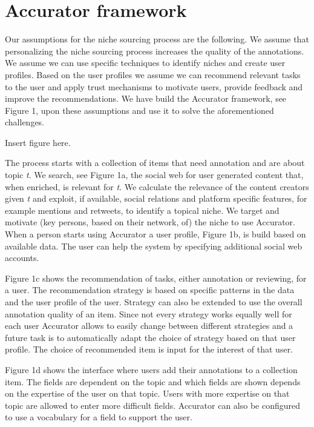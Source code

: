 \section{Accurator framework}
\label{architecture}
Our assumptions for the niche sourcing process are the following. We assume that personalizing the niche sourcing process increases the quality of the annotations. We assume we can use specific techniques to identify niches and create user profiles. Based on the user profiles we assume we can recommend relevant tasks to the user and apply trust mechanisms to motivate users, provide feedback and improve the recommendations.  We have build the Accurator framework, see Figure 1, upon these assumptions and use it to solve the aforementioned challenges. 

Insert figure here.

The process starts with a collection of items that need annotation and are about topic \textit{t}. We search, see Figure 1a,  the social web for user generated content that, when enriched, is relevant for \textit{t}. We calculate the relevance of the content creators given \textit{t} and exploit, if available, social relations and platform specific features, for example mentions and retweets, to identify a topical niche. We target and motivate (key persons, based on their network, of) the niche to use Accurator. When a person starts using Accurator a user profile, Figure 1b, is build based on available data. The user can help the system by specifying additional social web accounts.

Figure 1c shows the recommendation of tasks, either annotation or reviewing, for a user. The recommendation strategy is based on specific patterns in the data and the user profile of the user. Strategy can also be extended to use the overall annotation quality of an item. Since not every strategy works equally well for each user Accurator allows to easily change between different strategies and a future task is to automatically adapt the choice of strategy based on that user profile. The choice of recommended item is input for the interest of that user.

Figure 1d shows the interface where users add their annotations to a collection item. The fields are dependent on the topic and which fields are shown depends on the expertise of the user on that topic. Users with more expertise on that topic are allowed to enter more difficult fields. Accurator can also be configured to use a vocabulary for a field to support the user.

